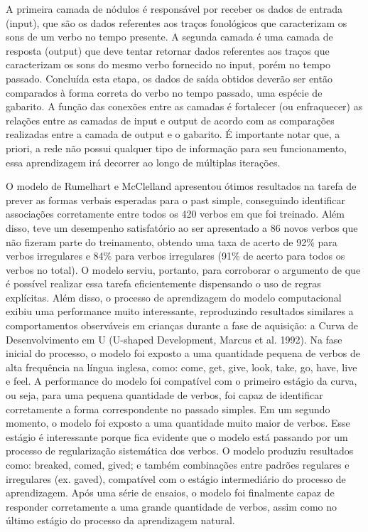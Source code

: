 A primeira camada de nódulos é responsável por receber os dados de entrada (input), que são os dados referentes aos traços fonológicos que caracterizam os sons de um verbo no tempo presente. A segunda camada é uma camada de resposta (output) que deve tentar retornar dados referentes aos traços que caracterizam os sons do mesmo verbo fornecido no input, porém no tempo passado. Concluída esta etapa, os dados de saída obtidos deverão ser então comparados à forma correta do verbo no tempo passado, uma espécie de gabarito. A função das conexões entre as camadas é fortalecer (ou enfraquecer) as relações entre as camadas de input e output de acordo com as comparações realizadas entre a camada de output e o gabarito. É importante notar que, a priori, a rede não possui qualquer tipo de informação para seu funcionamento, essa aprendizagem irá decorrer ao longo de múltiplas iterações.

O modelo de Rumelhart e McClelland apresentou ótimos resultados na tarefa de prever as formas verbais esperadas para o past simple, conseguindo identificar associações corretamente entre todos os 420 verbos em que foi treinado. Além disso, teve um desempenho satisfatório ao ser apresentado a 86 novos verbos que não fizeram parte do treinamento, obtendo uma taxa de acerto de 92\% para verbos irregulares e 84\% para verbos irregulares (91\% de acerto para todos os verbos no total). O modelo serviu, portanto, para corroborar o argumento de que é possível realizar essa tarefa eficientemente dispensando o uso de regras explícitas. Além disso, o processo de aprendizagem do modelo computacional exibiu uma performance muito interessante, reproduzindo resultados similares a comportamentos observáveis em crianças durante a fase de aquisição: a Curva de Desenvolvimento em U (U-shaped Development, Marcus et al. 1992). Na fase inicial do processo, o modelo foi exposto a uma quantidade pequena de verbos de alta frequência na língua inglesa, como: come, get, give, look, take, go, have, live e feel. A performance do modelo foi compatível com o primeiro estágio da curva, ou seja, para uma pequena quantidade de verbos, foi capaz de identificar corretamente a forma correspondente no passado simples. Em um segundo momento, o modelo foi exposto a uma quantidade muito maior de verbos. Esse estágio é interessante porque fica evidente que o modelo está passando por um processo de regularização sistemática dos verbos. O modelo produziu resultados como: breaked, comed, gived; e também combinações entre padrões regulares e irregulares (ex. gaved),  compatível com o estágio intermediário do processo de aprendizagem. Após uma série de ensaios, o modelo foi finalmente capaz de responder corretamente a uma grande quantidade de verbos, assim como no último estágio do processo da aprendizagem natural. 

